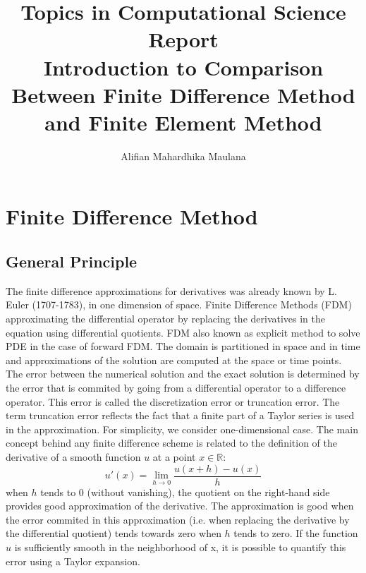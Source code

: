 \documentclass[a4paper,12pt]{article}
\title{Topics in Computational Science Report \\ Introduction to Comparison Between Finite Difference Method and Finite Element Method}
\author{Alifian Mahardhika Maulana}
\newcommand{\R}{\mathbb{R}}
\begin{document}
\maketitle
\section{Finite Difference Method}
\subsection{General Principle}
The finite difference approximations for derivatives was already known by L. Euler (1707-1783), in one dimension of space. Finite Difference Methods (FDM) approximating the differential operator by replacing the derivatives in the equation using differential quotients. FDM also known as explicit method to solve PDE in the case of forward FDM. The domain is partitioned in space and in time and approximations of the solution are computed at the space or time points. The error between the numerical solution and the exact solution is determined by the error that is commited by going from a differential operator to a difference operator. This error is called the discretization error or truncation error. The term truncation error reflects the fact that a finite part of a Taylor series is used in the approximation. For simplicity, we consider one-dimensional case. The main concept behind any finite difference scheme is related to the definition of the derivative of a smooth function $u$ at a point $x\in \R$:
\begin{equation}
u'(x) = \lim_{h\to 0} \frac{u(x+h)-u(x)}{h}
\end{equation}
when $h$ tends to 0 (without vanishing), the quotient on the right-hand side provides good approximation of the derivative. The approximation is good when the error commited in this approximation (i.e. when replacing the derivative by the differential quotient) tends towards zero when $h$ tends to zero. If the function $u$ is sufficiently smooth in the neighborhood of x, it is possible to quantify this error using a Taylor expansion.
\iftrue
\end{document}
